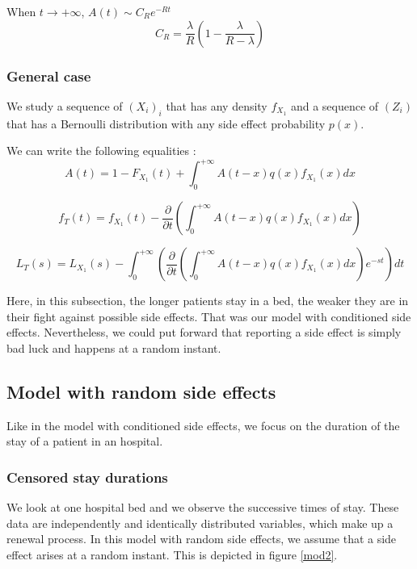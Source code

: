\documentclass[12pt,twoside]{article}
\begin{document}
When $t\rightarrow +\infty$, $A(t)\sim C_R e^{-Rt}$
\begin{equation}
C_R=\frac{\lambda}{R}(1-\frac{\lambda}{R-\lambda})
\label{eq_mod1_exp_qcq}
\end{equation}

\subsubsection{General case}

We study a sequence of $(X_i)_i$ that has any density $f_{X_1}$ and a sequence of $(Z_i)$ that has a Bernoulli distribution with any side effect probability $p(x)$.

We can write the following equalities :
$$A(t)=1-F_{X_1}(t)+\int_{0}^{+\infty}A(t-x)q(x)f_{X_1}(x)dx$$

$$f_T(t)=f_{X_1}(t)-\frac{\partial}{\partial t}(\int_{0}^{+\infty}A(t-x)q(x)f_{X_1}(x)dx)$$

$$L_T(s)=L_{X_1}(s) - \int_{0}^{+\infty}(\frac{\partial}{\partial t}(\int_{0}^{+\infty}A(t-x)q(x)f_{X_1}(x)dx)e^{-st})dt$$


Here, in this subsection, the longer patients stay in a bed, the weaker they are in their fight against possible side effects. That was our model with conditioned side effects. Nevertheless, we could put forward that reporting a side effect is simply bad luck and happens at a random instant.


\subsection{Model with random side effects}
Like in the model with conditioned side effects, we focus on the duration of the stay of a patient in an hospital.


\subsubsection{Censored stay durations}  
We look at one hospital bed and we observe the successive times of stay. These data are independently 
and identically distributed variables, which make up a renewal process. In this model with random side effects, 
we assume  that a side effect arises at a random instant. This is depicted in figure \ref{mod2}.\\
\end{document}
